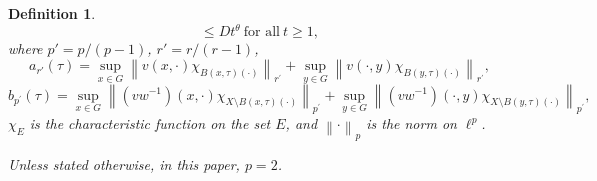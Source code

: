 \documentclass[preprint,11pt]{elsarticle}
\newtheorem{definition}{Definition}[section]
\numberwithin{equation}{section}
\begin{document}
\begin{definition}
\begin{equation}
			\le Dt^\theta ~ \text{for~all}~ t\ge 1,
		\end{equation} 
		where ${p}' =p/\left(p-1 \right)$, $r' =r/\left ( r-1 \right )$,
		\begin{equation*}\label{w3}
			a_{r'}(\tau)=\sup_{x\in G}\left \| v\left ( x,\cdot \right )\chi _{B\left ( x,\tau  \right )\left ( \cdot  \right )  }  \right \|_{r^{'}} +\sup_{y\in G}\left \| v\left ( \cdot,y \right )\chi _{B\left (y, \tau  \right )\left ( \cdot  \right )  } \right \|_{r^{'}},
		\end{equation*}
		\begin{equation*}
			b_{p^{'}}(\tau)=\sup_{x\in G}\left \| (vw^{-1})\left ( x,\cdot \right )\chi _{X\setminus B\left ( x,\tau  \right )\left ( \cdot  \right )  }  \right \|_{p^{'}} +\sup_{y\in G}\left \|( vw^{-1})\left ( \cdot,y \right )\chi _{X\setminus B\left (y, \tau  \right )\left ( \cdot  \right )  } \right \|_{p^{'}},
		\end{equation*}
		$\chi _{E}$ is the characteristic function on the set $E$, and $\left \| \cdot  \right \| _{p}$ is the norm on $\ell^{p}$.
		
		Unless stated otherwise, in this paper, $p=2$.
	\end{definition}
	
	
	
	
\end{document}
